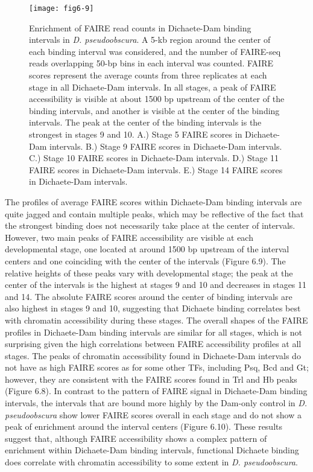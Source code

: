 \begin{figure}
\centering
\texttt{[image: fig6-9]}
\caption{Enrichment of FAIRE read counts in Dichaete-Dam binding intervals in \emph{D. pseudoobscura}. A 5-kb region around the center of each binding interval was considered, and the number of FAIRE-seq reads overlapping 50-bp bins in each interval was counted. FAIRE scores represent the average counts from three replicates at each stage in all Dichaete-Dam intervals. In all stages, a peak of FAIRE accessibility is visible at about 1500 bp upstream of the center of the binding intervals, and another is visible at the center of the binding intervals. The peak at the center of the binding intervals is the strongest in stages 9 and 10. A.) Stage 5 FAIRE scores in Dichaete-Dam intervals. B.) Stage 9 FAIRE scores in Dichaete-Dam intervals. C.) Stage 10 FAIRE scores in Dichaete-Dam intervals. D.) Stage 11 FAIRE scores in Dichaete-Dam intervals. E.) Stage 14 FAIRE scores in Dichaete-Dam intervals.}
\label{Figure 6.9}
\end{figure}

The profiles of average FAIRE scores within Dichaete-Dam binding intervals are quite jagged and contain multiple peaks, which may be reflective of the fact that the strongest binding does not necessarily take place at the center of intervals. However, two main peaks of FAIRE accessibility are visible at each developmental stage, one located at around 1500 bp upstream of the interval centers and one coinciding with the center of the intervals (Figure 6.9). The relative heights of these peaks vary with developmental stage; the peak at the center of the intervals is the highest at stages 9 and 10 and decreases in stages 11 and 14. The absolute FAIRE scores around the center of binding intervals are also highest in stages 9 and 10, suggesting that Dichaete binding correlates best with chromatin accessibility during these stages. The overall shapes of the FAIRE profiles in Dichaete-Dam binding intervals are similar for all stages, which is not surprising given the high correlations between FAIRE accessibility profiles at all stages. The peaks of chromatin accessibility found in Dichaete-Dam intervals do not have as high FAIRE scores as for some other TFs, including Psq, Bcd and Gt; however, they are consistent with the FAIRE scores found in Trl and Hb peaks (Figure 6.8). In contrast to the pattern of FAIRE signal in Dichaete-Dam binding intervals, the intervals that are bound more highly by the Dam-only control in \emph{D. pseudoobscura} show lower FAIRE scores overall in each stage and do not show a peak of enrichment around the interval centers (Figure 6.10). These results suggest that, although FAIRE accessibility shows a complex pattern of enrichment within Dichaete-Dam binding intervals, functional Dichaete binding does correlate with chromatin accessibility to some extent in \emph{D. pseudoobscura}.\\

